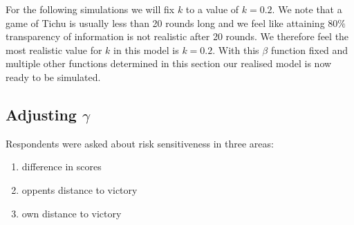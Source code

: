 For the following simulations we will fix $k$ to a value of $k = 0.2$. We note that a game of Tichu is usually less than 20 rounds long and we feel like attaining $80\%$ transparency of information is not realistic after 20 rounds. We therefore feel the most realistic value for $k$ in this model is $k = 0.2$. With this $\beta$ function fixed and multiple other functions determined in this section our realised model is now ready to be simulated.
\subsection{Adjusting $\gamma$}

Respondents were asked about risk sensitiveness in three areas:
\begin{enumerate}[(1)]
\item difference in scores
\item oppents distance to victory
\item own distance to victory
\end{enumerate}

